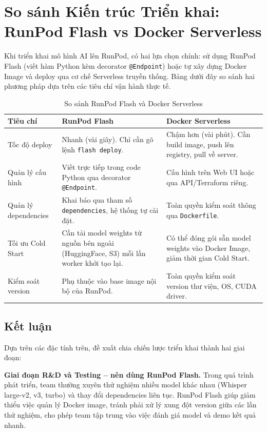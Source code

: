 \documentclass[12pt,a4paper]{article}
\begin{document}
\section{So sánh Kiến trúc Triển khai: RunPod Flash vs Docker Serverless}

Khi triển khai mô hình AI lên RunPod, có hai lựa chọn chính: sử dụng RunPod Flash (viết hàm Python kèm decorator \texttt{@Endpoint}) hoặc tự xây dựng Docker Image và deploy qua cơ chế Serverless truyền thống. Bảng dưới đây so sánh hai phương pháp dựa trên các tiêu chí vận hành thực tế.

\begin{table}[H]
\centering
\renewcommand{\arraystretch}{1.4}
\begin{tabularx}{\textwidth}{>{\raggedright\arraybackslash}p{3cm} X X}
\toprule
\textbf{Tiêu chí} & \textbf{RunPod Flash} & \textbf{Docker Serverless} \\
\midrule
Tốc độ deploy & Nhanh (vài giây). Chỉ cần gõ lệnh \texttt{flash deploy}. & Chậm hơn (vài phút). Cần build image, push lên registry, pull về server. \\
\midrule
Quản lý cấu hình & Viết trực tiếp trong code Python qua decorator \texttt{@Endpoint}. & Cấu hình trên Web UI hoặc qua API/Terraform riêng. \\
\midrule
Quản lý dependencies & Khai báo qua tham số \texttt{dependencies}, hệ thống tự cài đặt. & Toàn quyền kiểm soát thông qua \texttt{Dockerfile}. \\
\midrule
Tối ưu Cold Start & Cần tải model weights từ nguồn bên ngoài (HuggingFace, S3) mỗi lần worker khởi tạo lại. & Có thể đóng gói sẵn model weights vào Docker Image, giảm thời gian Cold Start. \\
\midrule
Kiểm soát version & Phụ thuộc vào base image nội bộ của RunPod. & Toàn quyền kiểm soát version thư viện, OS, CUDA driver. \\
\bottomrule
\end{tabularx}
\caption{So sánh RunPod Flash và Docker Serverless}
\end{table}

\subsection{Kết luận}

Dựa trên các đặc tính trên, đề xuất chia chiến lược triển khai thành hai giai đoạn:

\textbf{Giai đoạn R\&D và Testing -- nên dùng RunPod Flash.} Trong quá trình phát triển, team thường xuyên thử nghiệm nhiều model khác nhau (Whisper large-v2, v3, turbo) và thay đổi dependencies liên tục. RunPod Flash giúp giảm thiểu việc quản lý Docker image, tránh phải xử lý xung đột version giữa các lần thử nghiệm, cho phép team tập trung vào việc đánh giá model và demo kết quả nhanh.
\end{document}
